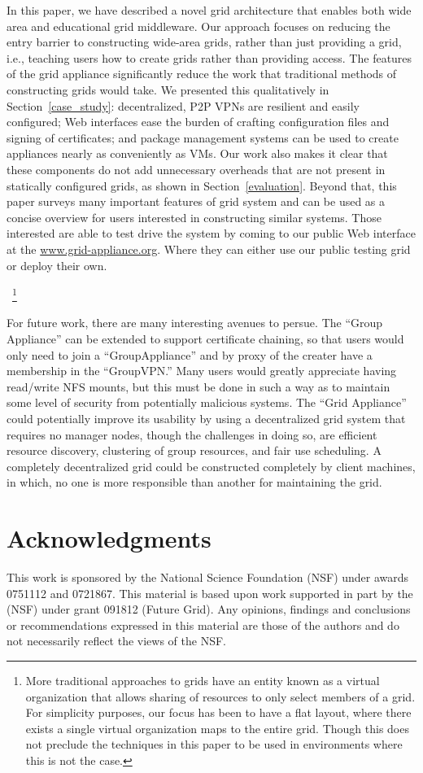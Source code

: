 \documentclass[conference]{IEEEtran}
\begin{document}
In this paper, we have described a novel grid architecture that enables both
wide area and educational grid middleware.  Our approach focuses on reducing
the entry barrier to constructing wide-area grids, rather than just providing a
grid, i.e., teaching users how to create grids rather than providing access.
The features of the grid appliance significantly reduce the work that
traditional methods of constructing grids would take.  We presented this
qualitatively in Section~\ref{case_study}:  decentralized, P2P VPNs are
resilient and easily configured; Web interfaces ease the burden of crafting
configuration files and signing of certificates; and package management systems
can be used to create appliances nearly as conveniently as VMs.  Our work also
makes it clear that these components do not add unnecessary overheads that are
not present in statically configured grids, as shown in
Section~\ref{evaluation}.  Beyond that, this paper surveys many important
features of grid system and can be used as a concise overview for users
interested in constructing similar systems.  Those interested are able to test
drive the system by coming to our public Web interface at the
\url{www.grid-appliance.org}.  Where they can either use our public testing
grid or deploy their own.

~\footnote{More traditional
approaches to grids have an entity known as a virtual organization that allows
sharing of resources to only select members of a grid.  For simplicity
purposes, our focus has been to have a flat layout, where there exists a single
virtual organization maps to the entire grid.  Though this does not preclude the
techniques in this paper to be used in environments where this is not the case.}

For future work, there are many interesting avenues to persue.  The ``Group
Appliance'' can be extended to support certificate chaining, so that users
would only need to join a ``GroupAppliance'' and by proxy of the creater have
a membership in the ``GroupVPN.''  Many users would greatly appreciate having
read/write NFS mounts, but this must be done in such a way as to maintain some
level of security from potentially malicious systems.  The ``Grid Appliance''
could potentially improve its usability by using a decentralized grid system
that requires no manager nodes, though the challenges in doing so, are
efficient resource discovery, clustering of group resources, and fair use
scheduling.  A completely decentralized grid could be constructed completely by
client machines, in which, no one is more responsible than another for
maintaining the grid.

\section*{Acknowledgments}

This work is sponsored by the National Science Foundation (NSF) under awards
0751112 and 0721867.  This material is based upon work supported in part by the
(NSF) under grant 091812 (Future Grid).  Any opinions, findings and conclusions
or recommendations expressed in this material are those of the authors and do
not necessarily reflect the views of the NSF.



\end{document}
